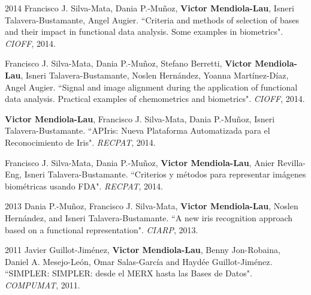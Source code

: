 \documentclass[]{friggeri-cv}
\begin{document}
\vspace{0.5cm}

\begin{paperlist}
  \paperentry
    {2014}
    {}
    {}
    {
		Francisco J. Silva-Mata, Dania P.-Muñoz, \textbf{Victor Mendiola-Lau}, Isneri Talavera-Bustamante, Angel Augier. ``Criteria and methods of selection of bases and their impact in functional data analysis. Some examples in biometrics". \emph{CIOFF}, 2014.
    }
\end{paperlist}

\begin{paperlist}
  \paperentry
    {}
    {}
    {}
    {
		Francisco J. Silva-Mata, Dania P.-Muñoz, Stefano Berretti, \textbf{Victor Mendiola-Lau}, Isneri Talavera-Bustamante, Noslen Hernández, Yoanna Martínez-Díaz, Angel Augier. ``Signal and image alignment during the application of functional data analysis. Practical examples of chemometrics and biometrics". \emph{CIOFF}, 2014.
    }
\end{paperlist}

\begin{paperlist}
  \paperentry
    {}
    {}
    {}
    {
		\textbf{Victor Mendiola-Lau}, Francisco J. Silva-Mata, Dania P.-Muñoz, Isneri Talavera-Bustamante. ``APIris: Nueva Plataforma Automatizada para el Reconocimiento de Iris". \emph{RECPAT}, 2014.
    }
\end{paperlist}

\begin{paperlist}
  \paperentry
    {}
    {}
    {}
    {
		Francisco J. Silva-Mata, Dania P.-Muñoz, \textbf{Victor Mendiola-Lau}, Anier Revilla-Eng, Isneri Talavera-Bustamante. ``Criterios y métodos para representar imágenes biométricas usando FDA". \emph{RECPAT}, 2014.
    }
\end{paperlist}

\vspace{0.5cm}

\begin{paperlist}
  \paperentry
    {2013}
    {}
    {}
    {
		Dania P.-Muñoz, Francisco J. Silva-Mata, \textbf{Victor Mendiola-Lau}, Noslen Hernández, and Isneri Talavera-Bustamante. ``A new iris recognition approach based on a functional representation". \emph{CIARP}, 2013.
    }
\end{paperlist}

\vspace{0.5cm}

\begin{paperlist}
  \paperentry
    {2011}
    {}
    {}
    {
		Javier Guillot-Jiménez, \textbf{Victor Mendiola-Lau}, Benny Jon-Robaina, Daniel A. Mesejo-León, Omar Salas-García and Haydée Guillot-Jiménez. ``SIMPLER: SIMPLER: desde el MERX hasta las Bases de Datos". \emph{COMPUMAT}, 2011.
    }
\end{paperlist}
\\
\end{document}
